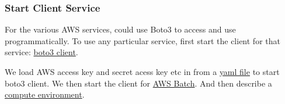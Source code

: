 \documentclass[
]{book}
\begin{document}
\hypertarget{start-client-service}{%
\subsubsection{Start Client Service}\label{start-client-service}}

For the various AWS services, could use Boto3 to access and use programmatically. To use any particular service, first start the client for that service: \href{https://boto3.amazonaws.com/v1/documentation/api/latest/reference/core/session.html\#boto3.session.Session.client}{boto3 client}.

We load AWS access key and secret acess key etc in from a \href{https://fanwangecon.github.io/pyfan/vig/support/inout/htmlpdfr/fp_yaml.html}{yaml file} to start boto3 client. We then start the client for \href{https://aws.amazon.com/batch/}{AWS Batch}. And then describe a \href{https://boto3.amazonaws.com/v1/documentation/api/latest/reference/services/batch.html\#Batch.Client.describe_compute_environments}{compute environment}.
\end{document}
